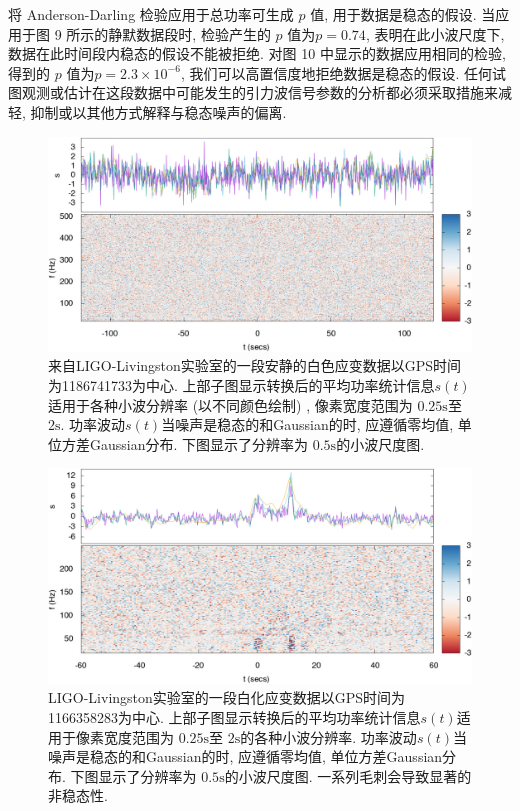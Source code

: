 \documentclass[a4paper]{\documentclassname}
\def\t{\text}
\theoremstyle{definition}
\begin{document}
将 Anderson-Darling 检验应用于总功率可生成 $p$ 值, 用于数据是稳态的假设. 当应用于图 9 所示的静默数据段时, 检验产生的 $p$ 值为$ p = 0.74$, 表明在此小波尺度下, 数据在此时间段内稳态的假设不能被拒绝. 对图 10 中显示的数据应用相同的检验, 得到的 $p$ 值为$p=2.3\times 10^{-6}$, 我们可以高置信度地拒绝数据是稳态的假设. 任何试图观测或估计在这段数据中可能发生的引力波信号参数的分析都必须采取措施来减轻, 抑制或以其他方式解释与稳态噪声的偏离. 
\begin{figure}[htbp]
    \centering
    \includegraphics{img/9.jpg}
    \caption{
        来自LIGO-Livingston实验室的一段安静的白色应变数据以GPS时间为1186741733为中心. 上部子图显示转换后的平均功率统计信息$s(t)$适用于各种小波分辨率 (以不同颜色绘制) , 像素宽度范围为 $0.25 \t{s}$至 $2 \t{s}$. 功率波动$s(t)$当噪声是稳态的和Gaussian的时, 应遵循零均值, 单位方差Gaussian分布. 下图显示了分辨率为 $0.5 \t{s}$的小波尺度图. 
    }
\end{figure}
\begin{figure}[htbp]
    \centering
    \includegraphics{img/10.jpg}
    \caption{
        LIGO-Livingston实验室的一段白化应变数据以GPS时间为1166358283为中心. 上部子图显示转换后的平均功率统计信息$s(t)$适用于像素宽度范围为 $0.25 \t{s}$至 $2 \t{s}$的各种小波分辨率. 功率波动$s(t)$当噪声是稳态的和Gaussian的时, 应遵循零均值, 单位方差Gaussian分布. 下图显示了分辨率为 $0.5 \t{s}$的小波尺度图. 一系列毛刺会导致显著的非稳态性. 
    }
\end{figure}
\end{document}
